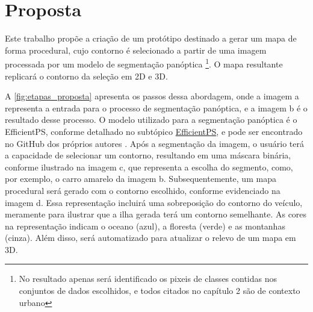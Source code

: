 \section{Proposta}

Este trabalho propõe a criação de um protótipo destinado a gerar um mapa de forma procedural, cujo contorno é selecionado a partir de uma imagem processada por um modelo de segmentação panóptica \footnote{No resultado apenas será identificado os pixeis de classes contidas nos conjuntos de dados escolhidos, e todos citados no capítulo 2 são de contexto urbano}. O mapa resultante replicará o contorno da seleção em 2D e 3D.

A \cref{fig:etapas_proposta} apresenta os passos dessa abordagem, onde a imagem a representa a entrada para o processo de segmentação panóptica, e a imagem b é o resultado desse processo. O modelo utilizado para a segmentação panóptica é o EfficientPS, conforme detalhado no subtópico \hyperref[sec:EfficientPS]{EfficientPS}, e pode ser encontrado no GitHub dos próprios autores . Após a segmentação da imagem, o usuário terá a capacidade de selecionar um contorno, resultando em uma máscara binária, conforme ilustrado na imagem c, que representa a escolha do segmento, como, por exemplo, o carro amarelo da imagem b. Subsequentemente, um mapa procedural será gerado com o contorno escolhido, conforme evidenciado na imagem d. Essa representação incluirá uma sobreposição do contorno do veículo, meramente para ilustrar que a ilha gerada terá um contorno semelhante. As cores na representação indicam o oceano (azul), a floresta (verde) e as montanhas (cinza). Além disso, será automatizado para atualizar o relevo de um mapa em 3D.

%




